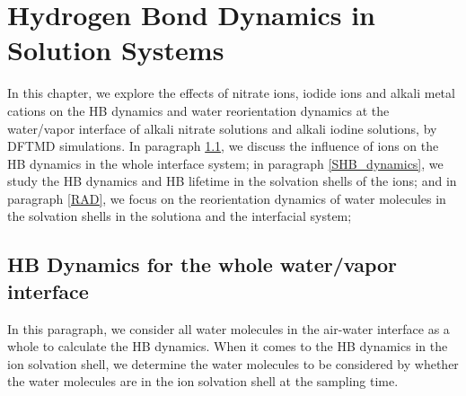 \chapter{Hydrogen Bond Dynamics in Solution Systems}\label{CHAPTER_HB_SOLUTIONS}
In this chapter, we explore the effects of nitrate ions, iodide ions and alkali metal cations 
on the HB dynamics and water reorientation dynamics at the water/vapor interface of alkali nitrate solutions and alkali
iodine solutions, by DFTMD simulations. %
In paragraph \ref{HBD_ITP}, we discuss the influence of ions on the HB dynamics in the whole interface system; 
in paragraph \ref{SHB_dynamics}, we study the HB dynamics and HB lifetime in the solvation shells of the ions;
and in paragraph \ref{RAD}, we focus on the reorientation dynamics of water molecules in the solvation shells in the solutiona and the interfacial system; 

\section{HB Dynamics for the whole water/vapor interface}\label{HBD_ITP}
In this paragraph, we consider all water molecules in the air-water interface as a whole to calculate the HB dynamics. 
When it comes to the HB dynamics in the ion solvation shell, 
we determine the water molecules to be considered by whether the water molecules are in the ion solvation shell
at the sampling time.
